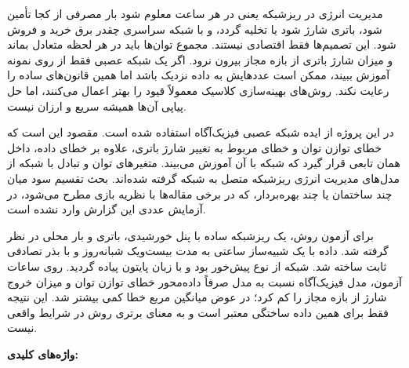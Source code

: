 
مدیریت انرژی در ریزشبکه یعنی در هر ساعت معلوم شود بار مصرفی از کجا تأمین شود، باتری شارژ شود یا تخلیه گردد، و با شبکه سراسری چقدر برق خرید و فروش شود. این تصمیم‌ها فقط اقتصادی نیستند. مجموع توان‌ها باید در هر لحظه متعادل بماند و میزان شارژ باتری از بازه مجاز بیرون نرود. اگر یک شبکه عصبی فقط از روی نمونه آموزش ببیند، ممکن است عددهایش به داده نزدیک باشد اما همین قانون‌های ساده را رعایت نکند. روش‌های بهینه‌سازی کلاسیک معمولاً قیود را بهتر اعمال می‌کنند، اما حل پیاپی آن‌ها همیشه سریع و ارزان نیست.

در این پروژه از ایده شبکه عصبی فیزیک‌آگاه استفاده شده است. مقصود این است که خطای توازن توان و خطای مربوط به تغییر شارژ باتری، علاوه بر خطای داده، داخل همان تابعی قرار گیرد که شبکه با آن آموزش می‌بیند. متغیرهای توان و تبادل با شبکه از مدل‌های مدیریت انرژی ریزشبکه متصل به شبکه گرفته شده‌اند. بحث تقسیم سود میان چند ساختمان یا چند بهره‌بردار، که در برخی مقاله‌ها با نظریه بازی مطرح می‌شود، در آزمایش عددی این گزارش وارد نشده است.

برای آزمون روش، یک ریزشبکه ساده با پنل خورشیدی، باتری و بار محلی در نظر گرفته شد. داده با یک شبیه‌ساز ساعتی به مدت بیست‌ویک شبانه‌روز و با بذر تصادفی ثابت ساخته شد. شبکه از نوع پیش‌خور بود و با زبان پایتون پیاده گردید. روی ساعات آزمون، مدل فیزیک‌آگاه نسبت به مدل صرفاً داده‌محور خطای توازن توان و میزان خروج شارژ از بازه مجاز را کم کرد؛ در عوض میانگین مربع خطا کمی بیشتر شد. این نتیجه فقط برای همین داده ساختگی معتبر است و به معنای برتری روش در شرایط واقعی نیست.

\vspace{0.6cm}
\noindent\textbf{واژه‌های کلیدی:} \KeywordsFa
